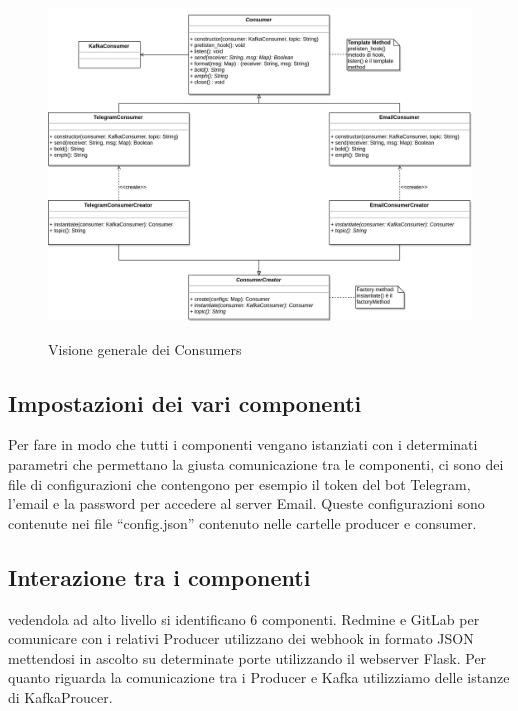 \begin{figure}[H]
    \centering
    \includegraphics[width=\textwidth]{img/Consumers.png}\\
    \caption{Visione generale dei Consumers}
    \label{fig:producers}
\end{figure}

\subsection{Impostazioni dei vari componenti}

Per fare in modo che tutti i componenti vengano istanziati con i determinati parametri che permettano la giusta comunicazione tra le componenti,
ci sono dei file di configurazioni che contengono per esempio il token del bot Telegram, l'email e la password per accedere al server Email. Queste configurazioni
sono contenute nei file ``config.json'' contenuto nelle cartelle producer e consumer.

\subsection{Interazione tra i componenti}

\Prog vedendola ad alto livello si identificano 6 componenti. Redmine e GitLab per comunicare con i relativi Producer utilizzano dei webhook in formato JSON
mettendosi in ascolto su determinate porte utilizzando il webserver Flask. Per quanto riguarda la comunicazione tra i Producer e Kafka utilizziamo delle istanze
di KafkaProucer. 









